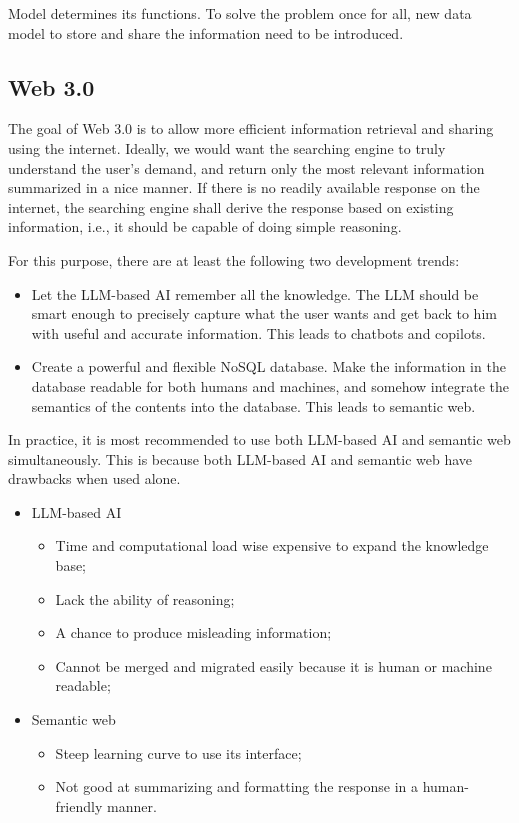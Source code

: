 Model determines its functions. To solve the problem once for all, new data model to store and share the information need to be introduced.

\subsection{Web 3.0}

The goal of Web 3.0 is to allow more efficient information retrieval and sharing using the internet. Ideally, we would want the searching engine to truly understand the user's demand, and return only the most relevant information summarized in a nice manner. If there is no readily available response on the internet, the searching engine shall derive the response based on existing information, i.e., it should be capable of doing simple reasoning. 

For this purpose, there are at least the following two development trends:
\begin{itemize}
  \item Let the LLM-based AI remember all the knowledge. The LLM should be smart enough to precisely capture what the user wants and get back to him with useful and accurate information. This leads to chatbots and copilots.
  \item Create a powerful and flexible NoSQL database. Make the information in the database readable for both humans and machines, and somehow integrate the semantics of the contents into the database. This leads to semantic web.
\end{itemize}

In practice, it is most recommended to use both LLM-based AI and semantic web simultaneously. This is because both LLM-based AI and semantic web have drawbacks when used alone.
\begin{itemize}
	\item LLM-based AI
	\begin{itemize}
		\item Time and computational load wise expensive to expand the knowledge base;
		\item Lack the ability of reasoning;
		\item A chance to produce misleading information;
		\item Cannot be merged and migrated easily because it is human or machine readable;
	\end{itemize}
	\item Semantic web
	\begin{itemize}
		\item Steep learning curve to use its interface;
		\item Not good at summarizing and formatting the response in a human-friendly manner.
	\end{itemize}
\end{itemize}


